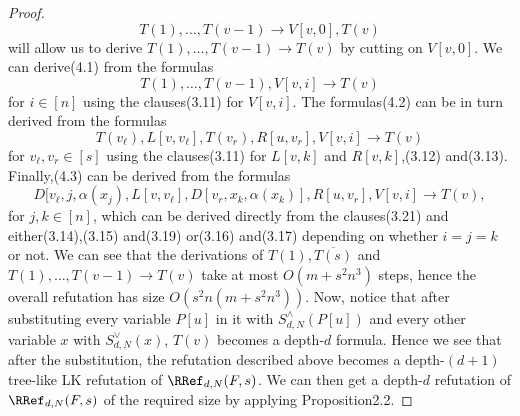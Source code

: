 \begin{proof}
\[T(1),\ldots,T(v-1)\to V[v,0],T(v)\tag{4.1}\]
will allow us to derive $T(1),\ldots,T(v-1)\to T(v)$ by cutting on $V[v,0]$. We can derive(4.1) from the formulas
\[T(1),\ldots,T(v-1),V[v,i]\to T(v)\tag{4.2}\]
for $i\in[n]$ using the clauses(3.11) for $V[v,i]$. The formulas(4.2) can be in turn derived from the formulas
\[T(v_\ell),L[v,v_\ell],T(v_r),R[u,v_r],V[v,i]\to T(v)\tag{4.3}\]
for $v_\ell,v_r\in[s]$ using the clauses(3.11) for $L[v,k]$ and $R[v,k]$,(3.12) and(3.13). Finally,(4.3) can be derived from the formulas
\[D[v_\ell,j,\alpha(x_j),L[v,v_\ell],D[v_r,x_k,\alpha(x_k)],R[u,v_r],V[v,i]\to T(v),\tag{4.4}\]
for $j,k\in[n]$, which can be derived directly from the clauses(3.21) and either(3.14),(3.15) and(3.19) or(3.16) and(3.17) depending on whether $i=j=k$ or not.
We can see that the derivations of $T(1),\overline{T(s)}$ and $T(1),\ldots,T(v-1)\to T(v)$ take at most $O(m+s^2n^3)$ steps, hence the overall refutation has size $O(s^2n(m+s^2n^3))$.
Now, notice that after substituting every variable $P[u]$ in it with $S_{d,N}^{\wedge}(P[u])$ and every other variable $x$ with $S_{d,N}^{\vee}(x)$, $T(v)$ becomes a depth-$d$ formula. Hence we see that after the substitution, the refutation described above becomes a depth-$(d+1)$ tree-like LK refutation of $\RRef_{d,N}(F,s)$. We can then get a depth-$d$ refutation of $\RRef_{d,N}(F,s)$ of the required size by applying Proposition2.2.
\end{proof}
